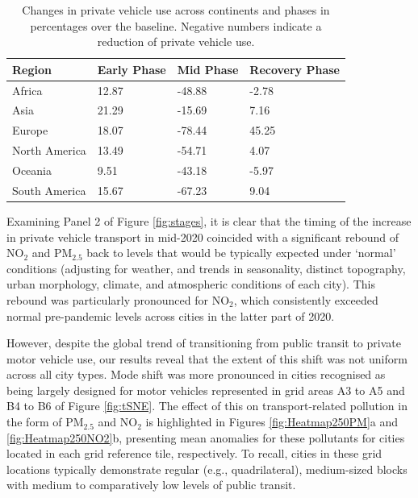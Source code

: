 \documentclass[preprint,10pt]{elsarticle} %
\begin{document}
\begin{table}
\caption{Changes in private vehicle use across continents and phases in percentages over the baseline. Negative numbers indicate a reduction of private vehicle use.}
\begin{tabular}{ |l|l|l|l| }
\hline
\textbf{Region} & \textbf{Early Phase} & \textbf{Mid Phase} & \textbf{Recovery Phase}  \\ 
\hline
Africa         & \cellcolor{red!12}12.87 & \cellcolor{blue!15}-48.88 & \cellcolor{blue!10}-2.78  \\ \hline
Asia           & \cellcolor{red!15}21.29 & \cellcolor{blue!10}-15.69 & \cellcolor{red!10} 7.16  \\ \hline
Europe         & \cellcolor{red!13}18.07 & \cellcolor{blue!20}-78.44 & \cellcolor{red!25} 45.25  \\ \hline
North America  & \cellcolor{red!12}13.49 & \cellcolor{blue!16}-54.71 & \cellcolor{red!10}4.07  \\ \hline
Oceania        &  \cellcolor{red!10}9.51 & \cellcolor{blue!15}-43.18 & \cellcolor{blue!10}-5.97  \\ \hline
South America  & \cellcolor{red!12}15.67 & \cellcolor{blue!18}-67.23 & \cellcolor{red!10}9.04  \\ \hline
\end{tabular}\label{tab:driving}
\end{table}

Examining Panel 2 of Figure \ref{fig:stages}, it is clear that the timing of the increase in private vehicle transport in mid-2020 coincided with a significant rebound of NO$_{2}$ and PM$_{2.5}$ back to levels that would be typically expected under `normal' conditions (adjusting for weather, and trends in seasonality, distinct topography, urban morphology, climate, and atmospheric conditions of each city\cite{Wijnands2022}). This rebound was particularly pronounced for NO$_{2}$, which consistently exceeded normal pre-pandemic levels across cities in the latter part of 2020.

However, despite the global trend of transitioning from public transit to private motor vehicle use\cite{fernando2023shaping}, our results reveal that the extent of this shift was not uniform across all city types. Mode shift  was more pronounced in cities recognised as being largely designed for motor vehicles\cite{Thompson2020} represented in grid areas A3 to A5 and B4 to B6 of Figure \ref{fig:tSNE}. The effect of this on transport-related pollution in the form of PM$_{2.5}$ and NO$_{2}$ is highlighted in Figures \ref{fig:Heatmap250PM}a and \ref{fig:Heatmap250NO2}b, presenting mean anomalies for these pollutants for cities located in each grid reference tile, respectively. To recall, cities in these grid locations typically demonstrate regular (e.g., quadrilateral), medium-sized blocks with medium to comparatively low levels of public transit.
\end{document}
